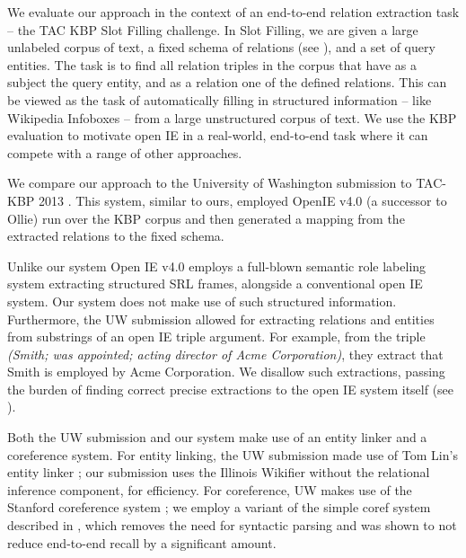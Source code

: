 We evaluate our approach in the context of an end-to-end relation extraction
  task -- the TAC KBP Slot Filling challenge.
In Slot Filling, we are given a large unlabeled corpus of text, a fixed
  schema of relations (see ), and a set of
  query entities.
The task is to find all relation triples in the corpus that have as a subject
  the query entity, and as a relation one of the defined relations.
This can be viewed as the task of automatically filling in structured information
  -- like Wikipedia Infoboxes -- from a large unstructured corpus of text.
We use the KBP evaluation to motivate open IE in a real-world, end-to-end task
  where it can compete with a range of other approaches.

We compare our approach to the University of Washington submission to
  TAC-KBP 2013 \cite{key:2013soderland-kbp}.
This system, similar to ours, employed OpenIE v4.0 (a successor to Ollie) 
  run over
  the KBP corpus and then generated a mapping from the extracted relations to
  the fixed schema.

Unlike our system Open IE v4.0 employs a full-blown semantic role
  labeling system extracting structured SRL frames, alongside a conventional
  open IE system.
Our system does not make use of such structured information.
Furthermore, the UW submission allowed for extracting relations and entities
  from substrings of an open IE triple argument.
For example, from the triple \textit{(Smith; was appointed; acting director of Acme
  Corporation)}, they extract that Smith is employed by Acme Corporation.
We disallow such extractions, passing the burden of finding correct
  precise extractions to the open IE system itself (see ).

Both the UW submission and our system make use of an entity linker
  and a coreference system.
For entity linking, the UW submission made use of Tom Lin's entity linker
  \cite{key:2012lin-el}; our submission uses the Illinois Wikifier 
  \cite{key:2011ratinov-el} without the relational inference component, for
  efficiency.
For coreference, UW makes use of the Stanford coreference system
  \cite{key:stanford-coref}; we employ a variant of the simple coref system
  described in \cite{key:2014pink-kbp}, which removes the need for syntactic
  parsing and was shown to not reduce end-to-end recall by a significant
  amount.

